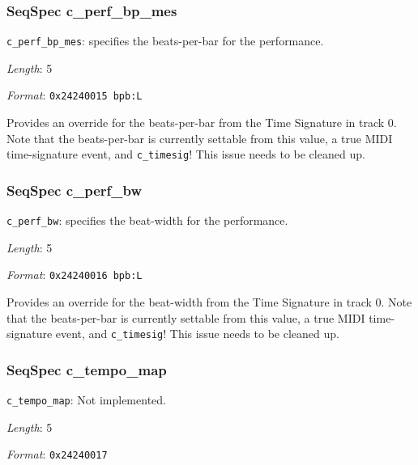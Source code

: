 \subsubsection{SeqSpec c\_perf\_bp\_mes}
\label{subsubsec:midi_format_track_seqspec_perf_bp_mes}

   \begin{description}
      \item \texttt{c\_perf\_bp\_mes}:
         specifies the beats-per-bar for the performance.
      \item \textsl{Length}: 5
      \item \textsl{Format}: \texttt{0x24240015 bpb:L}
   \end{description}

   Provides an override for the beats-per-bar from the Time Signature in track
   0.  Note that the beats-per-bar is currently settable from this value,
   a true MIDI time-signature event, and \texttt{c\_timesig}!
   This issue needs to be cleaned up.

\subsubsection{SeqSpec c\_perf\_bw}
\label{subsubsec:midi_format_track_seqspec_perf_bw}

   \begin{description}
      \item \texttt{c\_perf\_bw}:
         specifies the beat-width for the performance.
      \item \textsl{Length}: 5
      \item \textsl{Format}: \texttt{0x24240016 bpb:L}
   \end{description}

   Provides an override for the beat-width from the Time Signature in track 0.
   Note that the beats-per-bar is currently settable from this value,
   a true MIDI time-signature event, and \texttt{c\_timesig}!
   This issue needs to be cleaned up.

\subsubsection{SeqSpec c\_tempo\_map}
\label{subsubsec:midi_format_track_seqspec_tempo_map}

   \begin{description}
      \item \texttt{c\_tempo\_map}: Not implemented.
      \item \textsl{Length}: 5
      \item \textsl{Format}: \texttt{0x24240017}
   \end{description}

